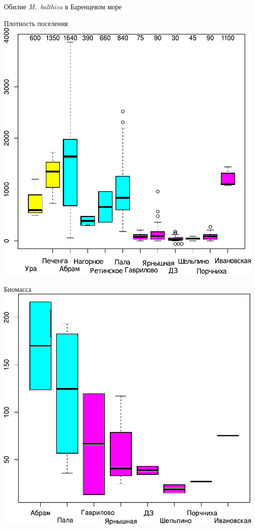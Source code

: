 \documentclass{beamer}
\begin{document}
\begin{frame}{Обилие {\it M.~balthica} в Баренцевом море}
	\begin{minipage}[t]{.49\linewidth}
		\begin{center}
		{\footnotesize Плотность поселения}
			\includegraphics[width=\textwidth]{N2_area_Barents2.pdf}
		\end{center}
	\end{minipage}
%
	\begin{minipage}[t]{.49\linewidth}
		\begin{center}
		{\footnotesize Биомасса}
			\includegraphics[width=\textwidth]{B_Barents_uchastki_ru2.pdf}
		\end{center}
	\end{minipage}



\end{frame}
\end{document}
